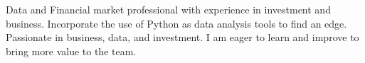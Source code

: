 

\begin{cvparagraph}

Data and Financial market professional with experience in investment and business. Incorporate the use of Python as data analysis tools to find an edge. Passionate in business, data, and investment. I am eager to learn and improve to bring more value to the team.
\end{cvparagraph}
